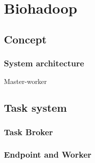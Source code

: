 \section{Biohadoop}
\subsection{Concept}
\begin{frame}
\frametitle{System architecture}
Master-worker
\end{frame}
\subsection{Task system}
\begin{frame}
\frametitle{Task Broker}
\end{frame}
\begin{frame}
\frametitle{Endpoint and Worker}
\end{frame}


